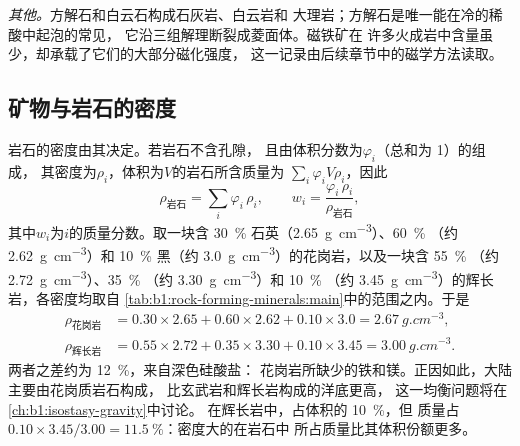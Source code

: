 \emph{其他。}方解石和白云石构成石灰岩、白云岩和
大理岩；方解石是唯一能在冷的稀酸中起泡的常见，
它沿三组解理断裂成菱面体。磁铁矿在
许多火成岩中含量虽少，却承载了它们的大部分磁化强度，
这一记录由后续章节中的磁学方法读取。


\subsection{矿物与岩石的密度}

岩石的密度由其决定。若岩石不含孔隙，
且由体积分数为$\varphi_i$（总和为 1）的组成，
其密度为$\rho_i$，体积为$V$的岩石所含质量为
$\sum_i \varphi_i V \rho_i$，因此
\[
  \rho_{\text{岩石}} = \sum_i \varphi_i\,\rho_i ,
  \qquad
  w_i = \frac{\varphi_i\,\rho_i}{\rho_{\text{岩石}}},
\]
其中$w_i$为$i$的质量分数。取一块含
\qty{30}{\percent} 石英（\qty{2.65}{g.cm^{-3}}）、\qty{60}{\percent}
（约 \qty{2.62}{g.cm^{-3}}）和 \qty{10}{\percent} 黑（约
\qty{3.0}{g.cm^{-3}}）的花岗岩，以及一块含 \qty{55}{\percent} （约
\qty{2.72}{g.cm^{-3}}）、\qty{35}{\percent} （约
\qty{3.30}{g.cm^{-3}}）和 \qty{10}{\percent} （约
\qty{3.45}{g.cm^{-3}}）的辉长岩，各密度均取自
\cref{tab:b1:rock-forming-minerals:main}中的范围之内。于是
\begin{align*}
  \rho_{\text{花岗岩}} &= 0.30\times2.65 + 0.60\times2.62 + 0.10\times3.0
  = \qty{2.67}{g.cm^{-3}},\\
  \rho_{\text{辉长岩}} &= 0.55\times2.72 + 0.35\times3.30 + 0.10\times3.45
  = \qty{3.00}{g.cm^{-3}}.
\end{align*}
两者之差约为 \qty{12}{\percent}，来自深色硅酸盐：
花岗岩所缺少的铁和镁。正因如此，大陆主要由花岗质岩石构成，
比玄武岩和辉长岩构成的洋底更高，
这一均衡问题将在\cref{ch:b1:isostasy-gravity}中讨论。
在辉长岩中，占体积的 \qty{10}{\percent}，但
质量占 $0.10\times3.45/3.00 = \qty{11.5}{\percent}$：密度大的在岩石中
所占质量比其体积份额更多。

